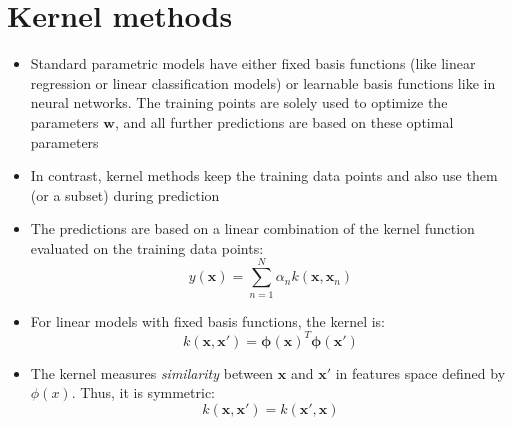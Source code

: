 \section{Kernel methods}
\begin{itemize}
	\item Standard parametric models have either fixed basis functions (like linear regression or linear classification models) or learnable basis functions like in neural networks. The training points are solely used to optimize the parameters $\bm{w}$, and all further predictions are based on these optimal parameters
	\item In contrast, kernel methods keep the training data points and also use them (or a subset) during prediction
	\item The predictions are based on a linear combination of the kernel function evaluated on the training data points:
	$$y(\bm{x}) = \sum\limits_{n=1}^{N} \alpha_n k\left(\bm{x}, \bm{x}_n \right)$$
	\item For linear models with fixed basis functions, the kernel is:
	$$k(\bm{x},\bm{x}') = \bm{\phi}(\bm{x})^T\bm{\phi}(\bm{x}')$$
	\item The kernel measures \textit{similarity} between $\bm{x}$ and $\bm{x}'$ in features space defined by $\phi(x)$. Thus, it is symmetric: $$k(\bm{x},\bm{x}')=k(\bm{x}',\bm{x})$$
\end{itemize}

